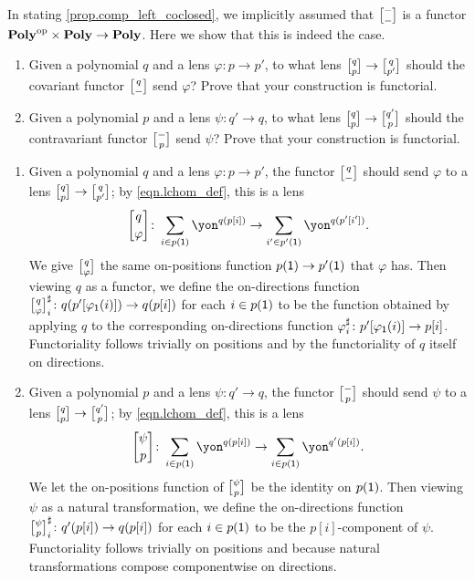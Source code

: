 \documentclass[Book-Poly]{subfiles}
\begin{document}
\begin{exercise} \label{exc.lchom_func}
In stating \cref{prop.comp_left_coclosed}, we implicitly assumed that $\lchom{-}{-}$ is a functor $\mathbf{Poly}^{\textnormal{op}}\times\mathbf{Poly}\to\mathbf{Poly}$.
Here we show that this is indeed the case.
\begin{enumerate}
    \item Given a polynomial $q$ and a lens $\varphi\colon p\to p'$, to what lens $\lchom{q}{p}\to\lchom{q}{p'}$ should the covariant functor $\lchom{q}{-}$ send $\varphi$?
    Prove that your construction is functorial.

    \item Given a polynomial $p$ and a lens $\psi\colon q'\to q$, to what lens $\lchom{q}{p}\to\lchom{q'}{p}$ should the contravariant functor $\lchom{-}{p}$ send $\psi$?
    Prove that your construction is functorial.
    \qedhere
\end{enumerate}
\begin{solution}
\begin{enumerate}
    \item Given a polynomial $q$ and a lens $\varphi\colon p\to p'$, the functor $\lchom{q}{-}$ should send $\varphi$ to a lens $\lchom{q}{p}\to\lchom{q}{p'}$; by \eqref{eqn.lchom_def}, this is a lens
    \[
        \lchom{q}{\varphi}\colon\sum_{i\in p(\1)}\yon^{q(p[i])}\to\sum_{i'\in p'(\1)}\yon^{q(p'[i'])}.
    \]
    We give $\lchom{q}{\varphi}$ the same on-positions function $p(\textsf{1})\to p'(\textsf{1})$ that $\varphi$ has.
    Then viewing $q$ as a functor, we define the on-directions function $\lchom{q}{\varphi}^\sharp_i\colon q(p'[\varphi_\1(i)])\to q(p[i])$ for each $i\in p(\textsf{1})$ to be the function obtained by applying $q$ to the corresponding on-directions function $\varphi^\sharp_i\colon p'[\varphi_{\textsf{1}}(i)]\to p[i]$.
    Functoriality follows trivially on positions and by the functoriality of $q$ itself on directions.

    \item Given a polynomial $p$ and a lens $\psi\colon q'\to q$, the functor $\lchom{-}{p}$ should send $\psi$ to a lens $\lchom{q}{p}\to\lchom{q'}{p}$; by \eqref{eqn.lchom_def}, this is a lens
    \[
        \lchom{\psi}{p}\colon\sum_{i\in p(\1)}\yon^{q(p[i])}\to\sum_{i\in p(\1)}\yon^{q'(p[i])}.
    \]
    We let the on-positions function of $\lchom{\psi}{p}$ be the identity on $p(\textsf{1})$.
    Then viewing $\psi$ as a natural transformation, we define the on-directions function $\lchom{\psi}{p}^\sharp_i\colon q'(p[i])\to q(p[i])$ for each $i\in p(\textsf{1})$ to be the $p[i]$-component of $\psi$.
    Functoriality follows trivially on positions and because natural transformations compose componentwise on directions.
\end{enumerate}
\end{solution}
\end{exercise}
\end{document}
